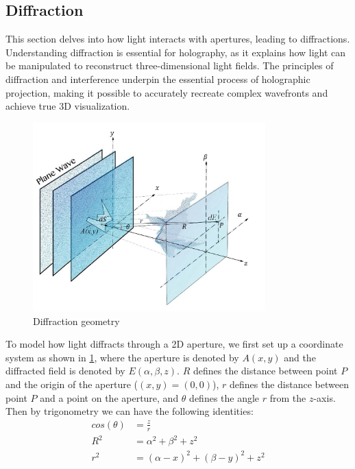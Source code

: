 \subsection{Diffraction} \label{sec:Diffraction}

This section delves into how light interacts with apertures, leading to diffractions. Understanding diffraction is essential for holography, as it explains how light can be manipulated to reconstruct three-dimensional light fields. The principles of diffraction and interference underpin the essential process of holographic projection, making it possible to accurately recreate complex wavefronts and achieve true 3D visualization.

\begin{figure}[H]
  \centering
  \includegraphics[width=0.8\textwidth]{diffraction_coordinate_definition.jpg}
  \caption{Diffraction geometry}\label{fig:diffraction_coordinate_definition}
\end{figure}

To model how light diffracts through a 2D aperture, we first set up a coordinate system as shown in \cref{fig:diffraction_coordinate_definition}, where the aperture is denoted by $A(x, y)$ and the diffracted field is denoted by $E(\alpha, \beta, z)$. $R$ defines the distance between point $P$ and the origin of the aperture ($(x,y)=(0,0)$), $r$ defines the distance between point $P$ and a point on the aperture, and $\theta$ defines the angle $r$ from the $z$-axis. Then by trigonometry we can have the following identities:
\begin{align}
  cos(\theta) & = \frac{z}{r}                      \label{eq:trignometry-theta} \\
  R^2         & = \alpha ^2 + \beta ^2 + z^2       \label{eq:trignometry-R} \\
  r^2         & = (\alpha-x)^2 + (\beta-y)^2 + z^2 \label{eq:trignometry-r}
\end{align}

